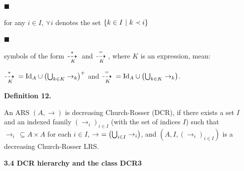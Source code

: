 \documentclass[10pt,a4paper]{amsart}
\begin{document}
\par\noindent  $\blacksquare$ 
 
for any $i\in I$, $\curlyvee i$ denotes the set $\{k\in I\leavevmode\nobreak\ |\leavevmode\nobreak\ k\prec i\}$\par
 
 
 
\par\noindent  $\blacksquare$ 
 
symbols of the form ${\mathop{\buildrel*\over{\dashrightarrow}\;}\limits_{K}}$ and ${\mathop{\buildrel=\over{\dashrightarrow}\;}\limits_{K}}$, where $K$ is an expression, mean:\par
 
 
 
${\mathop{\buildrel*\over{\dashrightarrow}\;}\limits_{K}}=\mathrm{Id}_{A}\cup%
\left(\bigcup_{k\in K}\to_{k}\right)^{+}$ and ${\mathop{\buildrel=\over{\dashrightarrow}\;}\limits_{K}}=\mathrm{Id}_{A}\cup%
\left(\bigcup_{k\in K}\to_{k}\right)$.\par
 
 
  
 
 
 
\par\medskip\noindent\textbf{Definition 12.}\par
 
 
An ARS $(A,\to)$ is decreasing Church-Rosser (DCR), if there exists a set $I$ and an indexed family $(\to_{i})_{i\in I}$ (with the set of indices $I$) such that $\to_{i}\,\subseteq A\times A$ for each $i\in I$, $\to\leavevmode\nobreak\ =\left(\bigcup_{i\in I}\to_{i}\right)$, and $(A,I,(\to_{i})_{i\in I})$ is a decreasing Church-Rosser LRS.\par
 
 
 
 
 
\par\medskip\noindent\textbf{3.4 DCR hierarchy and the class DCR3}\par
 
 
\end{document}
